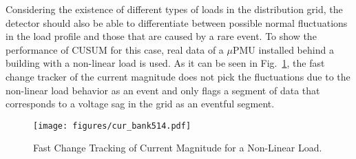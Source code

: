 \documentclass[twocolumn]{IEEEtran}
\newcommand{\mup}{\mu \text{PMU}}
\begin{document}
Considering the existence of different types of loads in the distribution grid, the detector should also be able to differentiate between possible normal fluctuations in the load profile and those that are caused by a rare event. To show the performance of CUSUM for this case, real data of a $\mup$ installed behind a building with a non-linear load is used. As it can be seen in Fig.~\ref{fig.current_bank514}, the fast change tracker of the current magnitude does not pick the fluctuations due to the non-linear load behavior as an event and only flags a segment of data that corresponds to a voltage sag in the grid as an eventful segment.
\begin{figure}[ht] 
\centering
    \texttt{[image: figures/cur\_bank514.pdf]}
	\caption{Fast Change Tracking of Current Magnitude for a Non-Linear Load.}
    \label{fig.current_bank514}
\end{figure}
%
%
\end{document}
